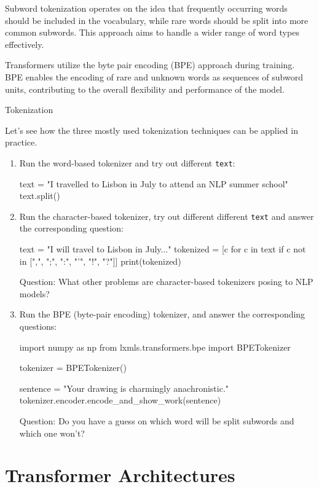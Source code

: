 Subword tokenization operates on the idea that frequently occurring words should be included in the vocabulary, while rare words should be split into more common subwords. This approach aims to handle a wider range of word types effectively.

Transformers utilize the byte pair encoding (BPE) approach \citep{bpe} during training. BPE enables the encoding of rare and unknown words as sequences of subword units, contributing to the overall flexibility and performance of the model.

\begin{exercise}
Tokenization

Let's see how the three mostly used tokenization techniques can be applied in practice.
\begin{enumerate}
\item Run the word-based tokenizer and try out different {\tt text}:
\begin{python}
text = "I travelled to Lisbon in July to attend an NLP summer school"
text.split()
\end{python}
\item Run the character-based tokenizer, try out different different {\tt text} and answer the corresponding question:
\begin{python}
text = "I will travel to Lisbon in July..."
tokenized = [c for c in text if c not in [",", ";", ":", "'", "!", "?"]]
print(tokenized)
\end{python}
Question: What other problems are character-based tokenizers posing to NLP models?


\item Run the BPE (byte-pair encoding) tokenizer, and answer the corresponding questions:
\begin{python}
import numpy as np
from lxmls.transformers.bpe import BPETokenizer

tokenizer = BPETokenizer()

sentence = "Your drawing is charmingly anachronistic."
tokenizer.encoder.encode_and_show_work(sentence)
\end{python}
Question: Do you have a guess on which word will be split subwords and which one won't?
\end{enumerate}
\end{exercise}



\section{Transformer Architectures}

